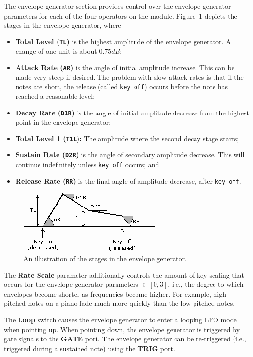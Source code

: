 \documentclass[12pt,letter]{article}
\begin{document}
The envelope generator section provides control over the envelope generator parameters for each of the four operators on the module. Figure~\ref{fig:envelope-generator} depicts the stages in the envelope generator, where
\begin{itemize}
 \item \textbf{Total Level (\texttt{TL})} is the highest amplitude of the envelope generator. A change of one unit is about $0.75dB$;
 \item \textbf{Attack Rate (\texttt{AR})} is the angle of initial amplitude increase. This can be made very steep if desired. The problem with slow attack rates is that if the notes are short, the release (called \texttt{key off}) occurs before the note has reached a reasonable level;
 \item \textbf{Decay Rate (\texttt{D1R})} is the angle of initial amplitude decrease from the highest point in the envelope generator;
 \item \textbf{Total Level 1 (\texttt{T1L}):} The amplitude where the second decay stage starts;
 \item \textbf{Sustain Rate (\texttt{D2R})} is the angle of secondary amplitude decrease. This will continue indefinitely unless \texttt{key off} occurs; and
 \item \textbf{Release Rate (\texttt{RR})} is the final angle of amplitude decrease, after \texttt{key off}.
\end{itemize}

\begin{figure}[!htp]
\centering
\caption{An illustration of the stages in the envelope generator.}
\label{fig:envelope-generator}
\includegraphics[width=\maxwidth{\textwidth}]{envelope}
\end{figure}

The \textbf{Rate Scale} parameter additionally controls the amount of key-scaling that occurs for the envelope generator parameters $\in [0, 3]$, i.e., the degree to which envelopes become shorter as frequencies become higher. For example, high pitched notes on a piano fade much more quickly than the low pitched notes.

The \textbf{Loop} switch causes the envelope generator to enter a looping LFO mode when pointing up. When pointing down, the envelope generator is triggered by gate signals to the \textbf{GATE} port. The envelope generator can be re-triggered (i.e., triggered during a sustained note) using the \textbf{TRIG} port.
\end{document}
